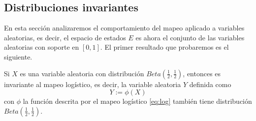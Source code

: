 \documentclass[../Main.tex]{subfiles}
\begin{document}
\subsection{Distribuciones invariantes}
En esta sección analizaremos el comportamiento del mapeo aplicado a variables aleatorias, es decir, el espacio de estados $E$ es ahora el conjunto de las variables aleatorias con soporte en $[0,1]$. El primer resultado que probaremos es el siguiente. 
\begin{proposition}
\label{prop:log_unif}
Si $X$ es una variable aleatoria con distribución $Beta\left(\frac{1}{2},\frac{1}{2}\right)$, entonces es invariante al mapeo logístico, es decir, la variable aleatoria $Y$ definida como  $$Y:=\phi(X)$$ con $\phi$ la función descrita por el mapeo logístico \ref{eq:log} también tiene distribución $Beta\left(\frac{1}{2},\frac{1}{2}\right)$.
\end{proposition}
\end{document}
